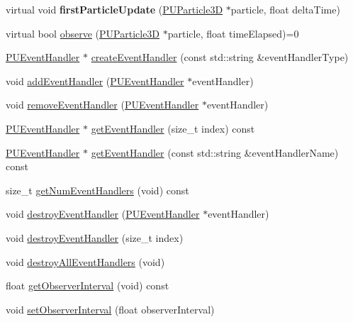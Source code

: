\begin{DoxyCompactItemize}
\mbox{\label{classPUObserver_a22d83c390d4ec1ffdedaa087d4e2a5af}} 
virtual void {\bfseries first\+Particle\+Update} (\hyperlink{structPUParticle3D}{P\+U\+Particle3D} $\ast$particle, float delta\+Time)
\item 
virtual bool \hyperlink{classPUObserver_a50f59cc3245e291b641463db5d3037f7}{observe} (\hyperlink{structPUParticle3D}{P\+U\+Particle3D} $\ast$particle, float time\+Elapsed)=0
\item 
\hyperlink{classPUEventHandler}{P\+U\+Event\+Handler} $\ast$ \hyperlink{classPUObserver_ae2a4fc75b6fb674ae8a83e61d55f3bfc}{create\+Event\+Handler} (const std\+::string \&event\+Handler\+Type)
\item 
void \hyperlink{classPUObserver_a5c2f1f1d9f90de62c986c0d57ee36950}{add\+Event\+Handler} (\hyperlink{classPUEventHandler}{P\+U\+Event\+Handler} $\ast$event\+Handler)
\item 
void \hyperlink{classPUObserver_abd9e5585ab25795109269ba07fbc51e6}{remove\+Event\+Handler} (\hyperlink{classPUEventHandler}{P\+U\+Event\+Handler} $\ast$event\+Handler)
\item 
\hyperlink{classPUEventHandler}{P\+U\+Event\+Handler} $\ast$ \hyperlink{classPUObserver_a7cbf02169d92612a139cc854e37d66d3}{get\+Event\+Handler} (size\+\_\+t index) const
\item 
\hyperlink{classPUEventHandler}{P\+U\+Event\+Handler} $\ast$ \hyperlink{classPUObserver_a12558402f3021048071e98cf557ff5a4}{get\+Event\+Handler} (const std\+::string \&event\+Handler\+Name) const
\item 
size\+\_\+t \hyperlink{classPUObserver_af173b2134fc4b4d2eae639cff104fe02}{get\+Num\+Event\+Handlers} (void) const
\item 
void \hyperlink{classPUObserver_ab9a8d586068cc43f9eed0a3440448bbc}{destroy\+Event\+Handler} (\hyperlink{classPUEventHandler}{P\+U\+Event\+Handler} $\ast$event\+Handler)
\item 
void \hyperlink{classPUObserver_a8470070593a74e4b940cf02550193c27}{destroy\+Event\+Handler} (size\+\_\+t index)
\item 
void \hyperlink{classPUObserver_a8fd1d6c0034cc9ff650718e3a3c667f3}{destroy\+All\+Event\+Handlers} (void)
\item 
float \hyperlink{classPUObserver_aeff68820bc2e27913c0b1f8bc18753d0}{get\+Observer\+Interval} (void) const
\item 
void \hyperlink{classPUObserver_a8346c5d59ec8435e8d17dfc317ae4b90}{set\+Observer\+Interval} (float observer\+Interval)

\end{DoxyCompactItemize}
